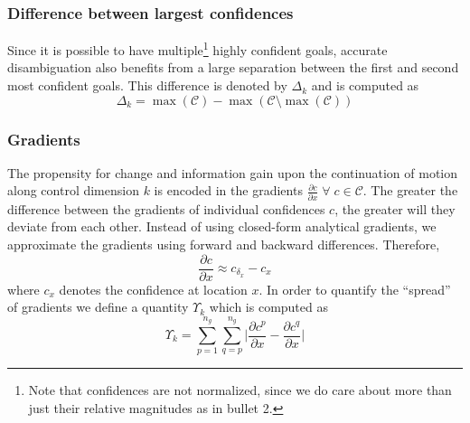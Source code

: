 \documentclass[conference]{IEEEtran}
\newcommand{\argmax}{\arg\!\max}
\begin{document}
\subsubsection{Difference between largest confidences}
%
Since it is possible to have multiple\footnote{Note that confidences are not normalized, since we do care about more than just their relative magnitudes as in bullet 2.} highly confident goals, accurate disambiguation also benefits from a large separation between the first and second most confident goals. 
This difference is denoted by $\Delta_{k}$ and is computed as
\begin{equation*}
\Delta_{k} = \max(\mathcal{C}) - \max(\mathcal{C} \setminus {\max(\mathcal{C})})
\end{equation*}
\subsubsection{Gradients}
The propensity for change and information gain upon the continuation of motion along control dimension $k$ is encoded in the gradients $\frac{\partial c}{\partial x}\; \forall\; c\in \mathcal{C}$. The greater the difference between the gradients of individual confidences $c$, the greater will they deviate from each other.  Instead of using closed-form analytical gradients, we approximate the gradients using forward and backward differences. Therefore, 
\begin{equation*}
\frac{\partial c}{\partial x} \approx c_{\delta_x} - c_{x} 
\end{equation*}
where $c_x$ denotes the confidence at location $x$.
In order to quantify the ``spread'' of gradients we define a quantity $\Upsilon_{k}$ which is computed as 
\begin{equation*}
\Upsilon_{k} = \sum_{p=1}^{n_g}\sum_{q=p}^{n_g}\Big \lvert\frac{\partial c^p}{\partial x} - \frac{\partial c^q}{\partial x}\Big \rvert
\end{equation*}
\end{document}
